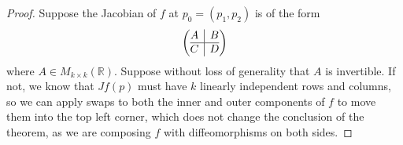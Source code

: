 \documentclass{article}
\theoremstyle{plain} %
\numberwithin{thm}{section} %
\theoremstyle{definition}
\begin{document}
    \begin{proof}
        Suppose the Jacobian of \(f\) at \(p_0 = (p_1, p_2)\) is of the form
        \[
            \left( \begin{array}{@{}c|c@{}}
                A & B \\
                \hline
                C & D \\
            \end{array} \right) 
        \]
        where \(A \in M_{k \times k}(\mathbb{R})\). Suppose without loss of generality that \(A\) is invertible. If not, we know that \(Jf(p)\) must have \(k\) linearly independent rows and columns, so we can apply swaps to both the inner and outer components of \(f\) to move them into the top left corner, which does not change the conclusion of the theorem, as we are composing \(f\) with diffeomorphisms on both sides.


\end{proof}
\end{document}
